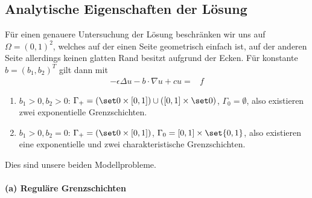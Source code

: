 \subsection{Analytische Eigenschaften der Lösung}
\label{sec:analyt-eigensch-der}

Für einen genauere Untersuchung der Lösung beschränken wir uns auf $\Omega = (0, 1)^{2}$, welches auf der einen Seite geometrisch einfach ist, auf der anderen Seite allerdings keinen glatten Rand besitzt aufgrund der Ecken. Für konstante $b = (b_{1}, b_{2})^{T}$ gilt dann mit
\begin{align*}
  - \epsilon \Delta u - b \cdot \nabla u + cu = & f 
\end{align*}
\begin{enumerate}
\item $b_{1} > 0, b_{2} > 0$: $\Gamma_{+} = (\set 0 \times [0, 1]) \cup([0, 1] \times\set 0)$, $\Gamma_{0} = \emptyset$, also existieren zwei exponentielle Grenzschichten.
\item $b_{1} > 0, b_{2} = 0$: $\Gamma_{+} = (\set 0 \times [0, 1])$, $\Gamma_{0} =  [0, 1] \times \set{0, 1}$, also existieren eine exponentielle und zwei charakteristische Grenzschichten.
\end{enumerate}
Dies sind unsere beiden Modellprobleme.

\paragraph{(a) Reguläre Grenzschichten}
\label{sec:a-regul-grenzsch}

